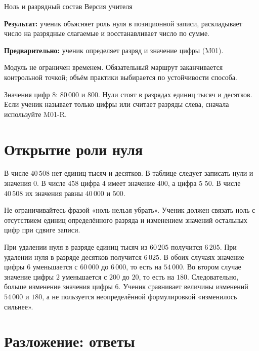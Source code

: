 \worksheettitle
  {Ноль и разрядный состав}
  { Версия учителя}

\begin{teacherbox}
  \textbf{Результат:} ученик объясняет роль нуля в позиционной записи,
  раскладывает число на разрядные слагаемые и восстанавливает число по сумме.

  \textbf{Предварительно:} ученик определяет разряд и значение цифры (M01).

  Модуль не ограничен временем. Обязательный маршрут заканчивается контрольной
  точкой; объём практики выбирается по устойчивости способа.
\end{teacherbox}

\begin{checkpointbox}
  Значения цифр \(8\): \(80\,000\) и \(800\). Нули стоят в разрядах единиц
  тысяч и десятков. Если ученик называет только цифры или считает разряды
  слева, сначала используйте M01-R.
\end{checkpointbox}

\section{Открытие роли нуля}

В числе \(40\,508\) нет единиц тысяч и десятков. В таблице следует записать
нули и значения \(0\). В числе \(458\) цифра \(4\) имеет значение \(400\), а
цифра \(5\) \textemdash{} \(50\). В числе \(40\,508\) их значения равны \(40\,000\) и
\(500\).

\begin{teacherbox}
  Не ограничивайтесь фразой «ноль нельзя убрать». Ученик должен связать ноль с
  отсутствием единиц определённого разряда и изменением значений остальных
  цифр при сдвиге записи.
\end{teacherbox}

При удалении нуля в разряде единиц тысяч из \(60\,205\) получится \(6\,205\).
При удалении нуля в разряде десятков получится \(6\,025\). В обоих случаях
значение цифры \(6\) уменьшается с \(60\,000\) до \(6\,000\), то есть на
\(54\,000\). Во втором случае значение цифры \(2\) уменьшается с \(200\) до
\(20\), то есть на \(180\). Следовательно, больше изменение значения цифры
\(6\). Ученик сравнивает величины изменений \(54\,000\) и \(180\), а не
пользуется неопределённой формулировкой «изменилось сильнее».

\section{Разложение: ответы}

